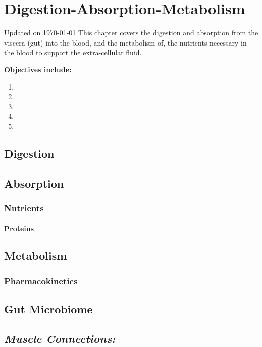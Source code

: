 \chapter{Digestion-Absorption-Metabolism}\label{chp:blood_nutrients}
Updated on \today
\minitoc
This chapter covers the digestion and absorption from the viscera (gut) into the blood, and the metabolism of, the nutrients necessary in the blood to support the extra-cellular fluid. 

\vspace{5mm}

\textbf{Objectives include:}
\begin{enumerate}
    \item
    \item
    \item
    \item
    \item
\end{enumerate}

\section{Digestion}

\section{Absorption}

\subsection{Nutrients}

\subsubsection{Proteins}


\section{Metabolism}
\subsection{Pharmacokinetics}


\section{Gut Microbiome}


\section{\textit{Muscle Connections:}}


